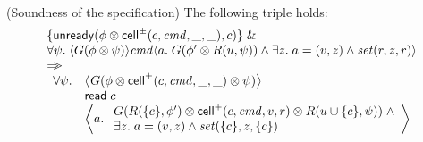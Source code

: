 \begin{prop*}{(Soundness of the  specification)}
The following triple holds:
\begin{displaymath}
\begin{array}{l}
\{{\mathsf{unready}({\phi \otimes \mathsf{cell}^{\pm}({c}, {\mathit{cmd}}, {\_}, {\_})}, {c})}\} \;\&\; \\
\forall \psi.\; \langle{G(\phi \otimes \psi)}\rangle{\mathit{cmd}}\langle{a}.\;{G(\phi' \otimes R(u, \psi)) \land \exists z.\; a = (v, z) \land \mathit{set}(r, z, r)}\rangle \\
\Rightarrow\!\!\!> \\
\begin{array}{ll}
 \forall \psi. & \left<G(\phi \otimes \mathsf{cell}^{\pm}({c}, {\mathit{cmd}}, {\_}, {\_}) \otimes \psi)\right> \\
               & \mathsf{read}\; c \\
               & \left<a.\; 
                   \begin{array}{l}
                     G(R(\{{c}\}, \phi') \otimes \mathsf{cell}^{+}({c}, {\mathit{cmd}}, {v}, {r}) \otimes R(u \cup \{{c}\}, \psi)) 
                      \;\land \\
                      \exists z.\;a = (v, z) \land \mathit{set}(\{{c}\}, z, \{{c}\})
                   \end{array}\right> 
\end{array}
\end{array}
\end{displaymath}
\end{prop*}

